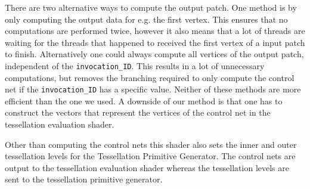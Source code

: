 		There are two alternative ways to compute the output patch. One method is by only computing the output data for e.g. the first vertex. This ensures that no computations are performed twice, however it also means that a lot of threads are waiting for the threads that happened to received the first vertex of a input patch to finish.  
		Alternatively one could always compute all vertices of the output patch, independent of the \texttt{invocation\_ID}. This results in a lot of unnecessary computations, but removes the branching required to only compute the control net if the \texttt{invocation\_ID} has a specific value. Neither of these methods are more efficient than the one we used. A downside of our method is that one has to construct the vectors that represent the vertices of the control net in the tessellation evaluation shader. 

		Other than computing the control nets this shader also sets the inner and outer tessellation levels for the Tessellation Primitive Generator. 
	The control nets are output to the tessellation evaluation shader whereas the tessellation levels are sent to the tessellation primitive generator. 


